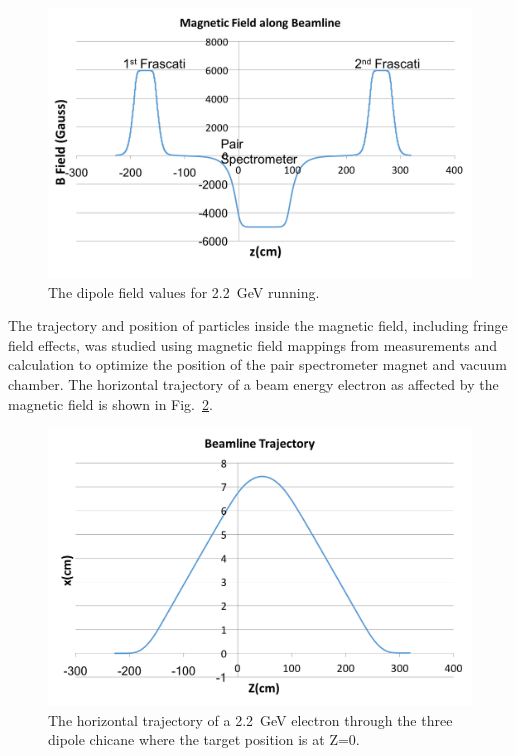 \documentclass[12pt]{report}
\begin{document}
\begin{figure}[H]
  \centering
      \includegraphics[width=1.0\textwidth]{pics/experiment/bfield.png}
  \caption[HPS magnetic fields]{The dipole field values for 2.2~GeV running.}
  \label{Figure:bField}
\end{figure}

The trajectory and position of particles inside the magnetic field, including fringe field effects, was studied using magnetic field mappings from measurements and calculation to optimize the position of the pair spectrometer magnet and vacuum chamber. The horizontal trajectory of a beam energy electron as affected by the magnetic field is shown in Fig.~\ref{Figure:trajectory}.

\begin{figure}[H]
  \centering
      \includegraphics[width=1.0\textwidth]{pics/experiment/feetrajectory.png}
  \caption[Charged particle trajectory in HPS beamline]{The horizontal trajectory of a 2.2~GeV electron through the three dipole chicane where the target position is at Z=0.}
  \label{Figure:trajectory}
\end{figure}
\end{document}
